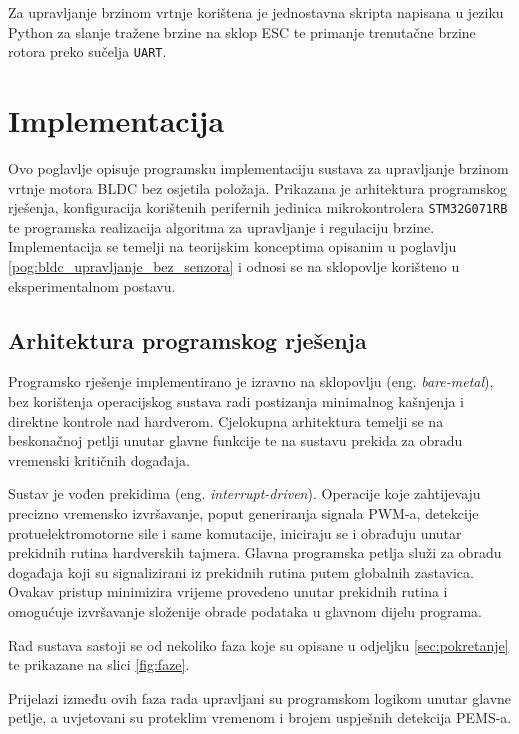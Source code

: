 \documentclass[diplomskirad]{fer}
\begin{document}
Za upravljanje brzinom vrtnje korištena je jednostavna skripta napisana u
jeziku Python za slanje tražene brzine na sklop ESC te primanje trenutačne
brzine rotora preko sučelja \texttt{UART}.

\chapter{Implementacija}
\label{pog:implementacija}

Ovo poglavlje opisuje programsku implementaciju sustava za upravljanje brzinom
vrtnje motora BLDC bez osjetila položaja. Prikazana je arhitektura programskog
rješenja, konfiguracija korištenih perifernih jedinica mikrokontrolera
\texttt{STM32G071RB} te programska realizacija algoritma za upravljanje i
regulaciju brzine. Implementacija se temelji na teorijskim konceptima opisanim
u poglavlju \ref{pog:bldc_upravljanje_bez_senzora} i odnosi se na sklopovlje
korišteno u eksperimentalnom postavu.

\section{Arhitektura programskog rješenja}
\label{sec:arhitektura_rjesenja}

Programsko rješenje implementirano je izravno na sklopovlju (eng.
\textit{bare-metal}), bez korištenja operacijskog sustava radi postizanja
minimalnog kašnjenja i direktne kontrole nad hardverom. Cjelokupna arhitektura
temelji se na beskonačnoj petlji unutar glavne funkcije te na sustavu prekida
za obradu vremenski kritičnih događaja.

Sustav je vođen prekidima (eng. \textit{interrupt-driven}). Operacije koje
zahtijevaju precizno vremensko izvršavanje, poput generiranja signala PWM-a,
detekcije protuelektromotorne sile i same komutacije, iniciraju se i obrađuju
unutar prekidnih rutina hardverskih tajmera. Glavna programska petlja služi za
obradu događaja koji su signalizirani iz prekidnih rutina putem globalnih
zastavica. Ovakav pristup minimizira vrijeme provedeno unutar prekidnih rutina
i omogućuje izvršavanje složenije obrade podataka u glavnom dijelu programa.

Rad sustava sastoji se od nekoliko faza koje su opisane u odjeljku
\ref{sec:pokretanje} te prikazane na slici \ref{fig:faze}.

Prijelazi između ovih faza rada upravljani su programskom logikom unutar glavne
petlje, a uvjetovani su proteklim vremenom i brojem uspješnih detekcija PEMS-a.
\end{document}
